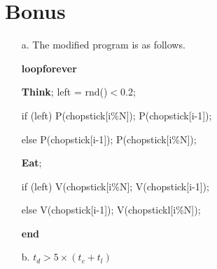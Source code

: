 \documentclass[12pt,letterpaper]{article}
\begin{document}
\section*{Bonus}
\begin{itemize}
\item[a.] The modified program is as follows.

\textbf{loopforever}

\hspace{3em}\textbf{Think}; left = rnd()$<$0.2;

\hspace{3em}if (left) P(chopstick[i\%N]); P(chopstick[i-1]);

\hspace{3em}else P(chopstick[i-1]); P(chopstick[i\%N]);

\hspace{3em}\textbf{Eat};

\hspace{3em}if (left) V(chopstick[i\%N]; V(chopstick[i-1]);

\hspace{3em}else V(chopstick[i-1]); V(chopstickl[i\%N]);

\textbf{end}

\item[b.] $t_d > 5\times(t_c+t_l)$
\end{itemize}
\end{document}

